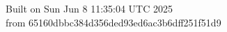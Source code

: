 {\noindent Built on Sun Jun  8 11:35:04 UTC 2025} \\ 
 {\noindent from 65160dbbc384d356ded93ed6ac3b6dff251f51d9}
